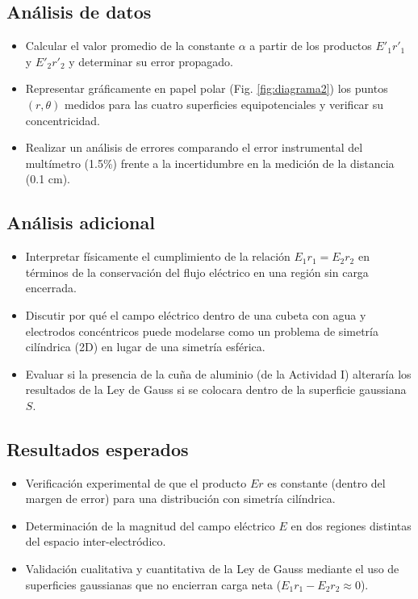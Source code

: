 \subsection{Análisis de datos}

\begin{itemize}
    \item Calcular el valor promedio de la constante $\alpha$ a partir de los productos $E'_1 r'_1$ y $E'_2 r'_2$ y determinar su error propagado.
    \item Representar gráficamente en papel polar (Fig. \ref{fig:diagrama2}) los puntos $(r, \theta)$ medidos para las cuatro superficies equipotenciales y verificar su concentricidad.
    \item Realizar un análisis de errores comparando el error instrumental del multímetro (1.5\%) frente a la incertidumbre en la medición de la distancia (0.1 cm).
\end{itemize}

\subsection{Análisis adicional}

\begin{itemize}
    \item Interpretar físicamente el cumplimiento de la relación $E_1 r_1 = E_2 r_2$ en términos de la conservación del flujo eléctrico en una región sin carga encerrada.
    \item Discutir por qué el campo eléctrico dentro de una cubeta con agua y electrodos concéntricos puede modelarse como un problema de simetría cilíndrica (2D) en lugar de una simetría esférica.
    \item Evaluar si la presencia de la cuña de aluminio (de la Actividad I) alteraría los resultados de la Ley de Gauss si se colocara dentro de la superficie gaussiana $S$.
\end{itemize}

\subsection{Resultados esperados}

\begin{itemize}
    \item Verificación experimental de que el producto $Er$ es constante (dentro del margen de error) para una distribución con simetría cilíndrica.
    \item Determinación de la magnitud del campo eléctrico $E$ en dos regiones distintas del espacio inter-electródico.
    \item Validación cualitativa y cuantitativa de la Ley de Gauss mediante el uso de superficies gaussianas que no encierran carga neta ($E_1 r_1 - E_2 r_2 \approx 0$).
\end{itemize}

